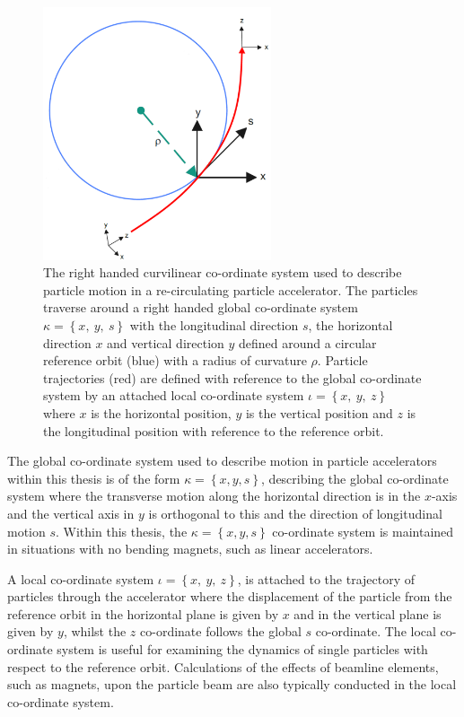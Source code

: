 \documentclass[../main.tex]{subfiles}
\begin{document}
\begin{figure}[!h]
\centering
\includegraphics[width=0.6\textwidth]{Figures/Energy_Recovery_Linac_Design/Accelerator_Coord_System_fixed_V2.pdf}
\caption{The right handed curvilinear co-ordinate system used to describe particle motion in a re-circulating particle accelerator. The particles traverse around a right handed global co-ordinate system $\kappa=\left\{x,~y,~s\right\}$ with the longitudinal direction $s$, the horizontal direction $x$ and vertical direction $y$ defined around a circular reference orbit (blue) with a radius of curvature $\rho$. Particle trajectories (red)
are defined with reference to the global co-ordinate system by an attached local co-ordinate system $\iota=\left\{x,~y,~z\right\}$ where $x$ is the horizontal position, $y$ is the vertical position and $z$ is the longitudinal position with reference to the reference orbit.}
\label{fig:accelerator_coord_system}
\end{figure}

The global co-ordinate system used to describe motion in particle accelerators within this thesis is of the form $\kappa = \left\{x,y,s\right\}$, describing the global co-ordinate system where the transverse motion along the horizontal direction is in the $x$-axis and the vertical axis in $y$ is orthogonal to this and the direction of longitudinal motion $s$. Within this thesis, the $\kappa = \left\{x,y,s\right\}$ co-ordinate system is maintained in situations with no bending magnets, such as linear accelerators.  

A local co-ordinate system $\iota=\left\{x,~y,~z\right\}$, is attached to the trajectory of particles through the accelerator where the displacement of the particle from the reference orbit in the horizontal plane is given by $x$ and in the vertical plane is given by $y$, whilst the $z$ co-ordinate follows the global $s$ co-ordinate. The local co-ordinate system is useful for examining the dynamics of single particles with respect to the reference orbit. Calculations of the effects of beamline elements, such as magnets, upon the particle beam are also typically conducted in the local co-ordinate system.
\end{document}
